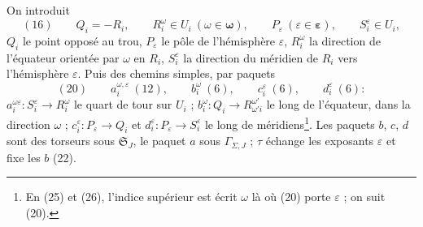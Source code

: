 \documentclass[11pt,a4paper]{article}
\begin{document}
On introduit
\[
(16)\qquad Q_i = -R_i, \qquad R_i^{\omega} \in U_i\ (\omega \in \boldsymbol{\omega}), \qquad P_\varepsilon\ (\varepsilon \in \boldsymbol{\varepsilon}), \qquad S_i^{\varepsilon} \in U_i ,
\]
$Q_i$ le point opposé au trou, $P_\varepsilon$ le pôle de l'hémisphère
$\varepsilon$, $R_i^{\omega}$ la direction de l'équateur orientée par $\omega$
en $R_i$, $S_i^{\varepsilon}$ la direction du méridien de $R_i$ vers
l'hémisphère $\varepsilon$. Puis des chemins simples, par paquets
\[
(20)\qquad a_i^{\omega,\varepsilon}\ (12), \qquad b_i^{\omega}\ (6), \qquad c_i^{\varepsilon}\ (6), \qquad d_i^{\varepsilon}\ (6) :
\]
$a_i^{\omega\varepsilon} : S_i^{\varepsilon} \to R_i^{\omega}$ le quart de tour
sur $U_i$ ; $b_i^{\omega} : Q_i \to R^{\omega'}_{\omega' i}$ le long de
l'équateur, dans la direction $\omega$ ; $c_i^{\varepsilon} : P_\varepsilon
\to Q_i$ et $d_i^{\varepsilon} : P_\varepsilon \to S_i^{\varepsilon}$ le long
de méridiens\footnote{En (25) et (26), l'indice supérieur est écrit $\omega$ là
où (20) porte $\varepsilon$ ; on suit (20).}. Les paquets $b$, $c$, $d$ sont
des torseurs sous $\mathfrak{S}_J$, le paquet $a$ sous $\Gamma_{\Sigma,J}$ ;
$\tau$ échange les exposants $\varepsilon$ et fixe les $b$ (22).
\end{document}
